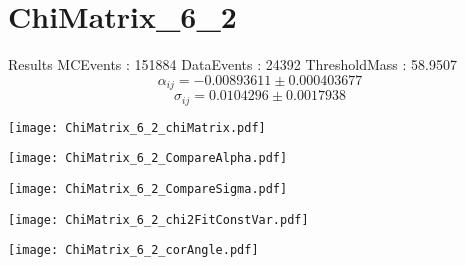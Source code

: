 \documentclass[a4paper,12pt]{article}
\begin{document}
\section{ChiMatrix\_6\_2}
\begin{minipage}{0.49\linewidth} Results \newline
MCEvents : 151884\newline
DataEvents : 24392 \newline
ThresholdMass : 58.9507\\
$$\alpha_{ij} = -0.00893611\pm 0.000403677$$
$$\sigma_{ij} = 0.0104296\pm 0.0017938$$
\end{minipage}\hfill
\begin{minipage}{0.49\linewidth} 
\texttt{[image: ChiMatrix\_6\_2\_chiMatrix.pdf]}\\
\end{minipage}
\hfill
\begin{minipage}{0.49\linewidth} 
\texttt{[image: ChiMatrix\_6\_2\_CompareAlpha.pdf]}\\
\end{minipage}
\hfill
\begin{minipage}{0.49\linewidth} 
\texttt{[image: ChiMatrix\_6\_2\_CompareSigma.pdf]}\\
\end{minipage}
\begin{minipage}{0.49\linewidth} 
\texttt{[image: ChiMatrix\_6\_2\_chi2FitConstVar.pdf]}\\
\end{minipage}
\hfill
\begin{minipage}{0.49\linewidth} 
\texttt{[image: ChiMatrix\_6\_2\_corAngle.pdf]}\\
\end{minipage}
\end{document}

